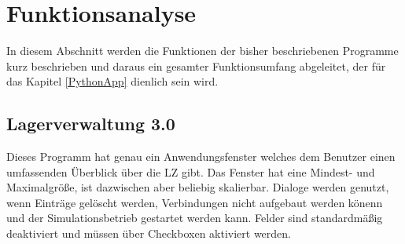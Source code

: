 \newpage
\section{Funktionsanalyse}\label{funktionsanalyse}
In diesem Abschnitt werden die Funktionen der bisher beschriebenen Programme kurz beschrieben und daraus ein gesamter
Funktionsumfang abgeleitet, der für das Kapitel \ref{PythonApp} dienlich sein wird.

\subsection{Lagerverwaltung 3.0}
Dieses Programm hat genau ein Anwendungsfenster welches dem Benutzer einen umfassenden Überblick über die LZ gibt.
Das Fenster hat eine Mindest- und Maximalgröße, ist dazwischen aber beliebig skalierbar. Dialoge werden genutzt, wenn
Einträge gelöscht werden, Verbindungen nicht aufgebaut werden könenn und der Simulationsbetrieb gestartet werden kann.
Felder sind standardmäßig deaktiviert und müssen über Checkboxen aktiviert werden. \\

